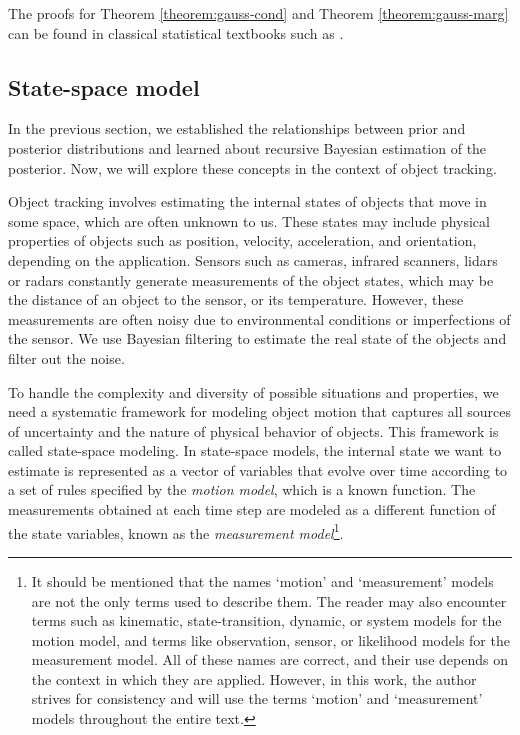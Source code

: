 The proofs for Theorem \ref{theorem:gauss-cond} and Theorem \ref{theorem:gauss-marg} can be found in classical statistical textbooks such as \cite[pp. 161-163]{johnsonAppliedMultivariateStatistical2007}.

\subsection{State-space model}\label{sec:state-model}

In the previous section, we established the relationships between prior and 
posterior distributions and learned about recursive Bayesian estimation of the 
posterior. Now, we will explore these concepts in the context of object 
tracking.

Object tracking involves estimating the internal states of objects that move in 
some space, which are often unknown to us. These states may include physical 
properties of objects such as position, velocity, acceleration, and 
orientation, depending on the application. Sensors such as cameras, infrared 
scanners, lidars or radars constantly generate measurements of the object 
states, which may be the distance of an object to the sensor, or its 
temperature. However, these measurements are often noisy due to environmental 
conditions or imperfections of the sensor. We use Bayesian filtering to 
estimate the real state of the objects and filter out the noise.

To handle the complexity and diversity of possible situations and properties, 
we need a systematic framework for modeling object motion that captures all 
sources of uncertainty and the nature of physical behavior of objects. This 
framework is called state-space modeling. In state-space models, the internal 
state we want to estimate is represented as a vector of variables that evolve 
over time according to a set of rules specified by the \textit{motion model}, 
which is a known function. The measurements obtained at each time step are 
modeled as a different function of the state variables, known as the 
\textit{measurement model}\footnote{
    It should be mentioned that the names `motion' and `measurement' models are 
    not the only terms used to describe them. The reader may also encounter 
    terms such as kinematic, state-transition, dynamic, or system models for the 
    motion model, and terms like observation, sensor, or likelihood models for 
    the measurement model. All of these names are correct, and their use depends 
    on the context in which they are applied. However, in this work, the author 
    strives for consistency and will use the terms `motion' and `measurement' 
    models throughout the entire text.
}.

